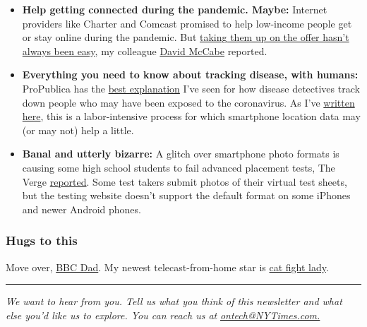 \begin{itemize}
\item
  \textbf{Help getting connected during the pandemic. Maybe:} Internet
  providers like Charter and Comcast promised to help low-income people
  get or stay online during the pandemic. But
  \href{https://www.nytimes3xbfgragh.onion/2020/05/20/technology/coronavirus-broadband-discounts.html}{taking
  them up on the offer hasn't always been easy}, my colleague
  \href{https://www.nytimes3xbfgragh.onion/by/david-mccabe}{David
  McCabe} reported.
\item
  \textbf{Everything you need to know about tracking disease, with
  humans:} ProPublica has the
  \href{https://www.propublica.org/article/you-dont-need-invasive-tech-for-successful-contact-tracing-heres-how-it-works}{best
  explanation} I've seen for how disease detectives track down people
  who may have been exposed to the coronavirus. As I've
  \href{https://www.nytimes3xbfgragh.onion/2020/04/29/technology/coronavirus-contact-tracing-technology.html}{written
  here}, this is a labor-intensive process for which smartphone location
  data may (or may not) help a little.
\item
  \textbf{Banal and utterly bizarre:} A glitch over smartphone photo
  formats is causing some high school students to fail advanced
  placement tests, The Verge
  \href{https://www.theverge.com/2020/5/20/21262302/ap-test-fail-iphone-photos-glitch-email-college-board-jpeg-heic}{reported}.
  Some test takers submit photos of their virtual test sheets, but the
  testing website doesn't support the default format on some iPhones and
  newer Android phones.
\end{itemize}

\hypertarget{hugs-to-this}{%
\subsubsection{Hugs to this}\label{hugs-to-this}}

Move over, \href{https://www.youtube.com/watch?v=Mh4f9AYRCZY}{BBC Dad}.
My newest telecast-from-home star is
\href{https://twitter.com/ratemyskyperoom/status/1261684025502113794}{cat
fight lady}.

\begin{center}\rule{0.5\linewidth}{\linethickness}\end{center}

\emph{We want to hear from you. Tell us what you think of this
newsletter and what else you'd like us to explore. You can reach us at}
\href{mailto:ontech@NYTimes.com?subject=On\%20Tech\%20Feedback}{\emph{ontech@NYTimes.com.}}

